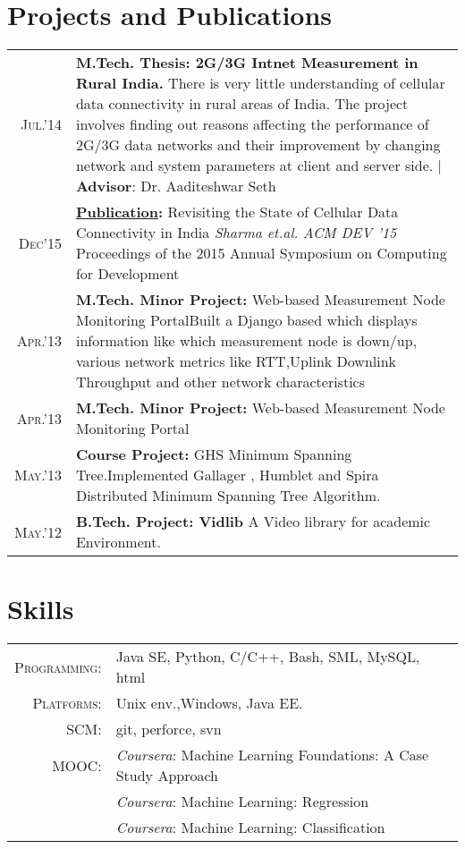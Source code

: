 \documentclass[a4paper,10pt]{article}
\begin{document}
\section{Projects and Publications}
\begin{tabular}{rp{15cm}}
 \textsc{Jul.'14} & \textbf{M.Tech. Thesis: 2G/3G Intnet Measurement in Rural India.}
 \normalsize There is very little understanding of cellular data connectivity
in rural areas of India. The project involves finding out reasons affecting
the performance of 2G/3G data networks and their improvement by changing
network and system parameters at client and server side.  | \small\textbf{ Advisor}: Dr. Aaditeshwar Seth\\
\textsc{Dec'15} & \textbf{\href{http://dl.acm.org/citation.cfm?id=2830649}{Publication}:} Revisiting the State of Cellular Data Connectivity in India \emph{Sharma et.al.} \emph{ACM DEV '15} Proceedings of the 2015 Annual Symposium on Computing for Development\\
\textsc{Apr.'13} & \textbf{M.Tech. Minor Project:} Web-based Measurement Node Monitoring Portal\normalsize Built a Django based which displays information like which measurement node is down/up, various network metrics like RTT,Uplink Downlink Throughput and other network characteristics\\
\textsc{Apr.'13} & \textbf{M.Tech. Minor Project:} Web-based Measurement Node Monitoring Portal\\
\textsc{May.'13} & \textbf{Course Project:} GHS Minimum Spanning Tree.Implemented Gallager \normalsize , Humblet and Spira Distributed Minimum Spanning Tree Algorithm. \\
\textsc{May.'12} & \textbf{B.Tech. Project: Vidlib} A Video library for academic Environment.\\
\end{tabular}

\section{Skills}
\begin{tabular}{rp{15cm}}
\textsc{Programming:} & Java SE, Python, C/C++, Bash, SML, MySQL, html\\
\textsc{Platforms:} & Unix env.,Windows, Java EE.\\
\textsc{SCM:} & git, perforce, svn\\
\textsc{MOOC:} & \emph{Coursera}: Machine Learning Foundations: A Case Study Approach\\ &\normalsize \emph{Coursera}: Machine Learning: Regression \\ &\normalsize \emph{Coursera}: Machine Learning: Classification
\end{tabular}
\end{document}

